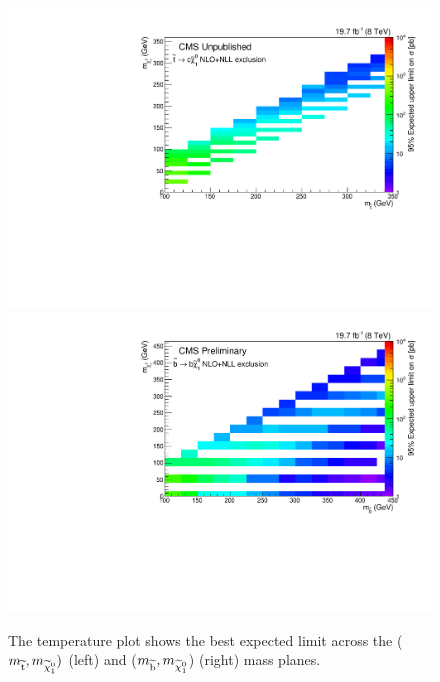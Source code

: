 \begin{figure}[!Hhtb]
  \begin{center}
  \includegraphics[scale=0.39]{Figures/sus13009/limitplots/plots/stop/optimal_stop_expected.pdf}
  \includegraphics[scale=0.39]{Figures/sus13009/limitplots/plots/sbottom/optimal_sbottom_expected.pdf}
  \caption{The temperature plot shows the best expected limit across the ($m_{\widetilde{{\rm t}}}, m_{\widetilde{\chi}^{0}_{1}})$ (left) and ($m_{\widetilde{{\rm b}}},m_{\widetilde{\chi}^{0}_{1}}$) (right) mass planes.}
  \label{fig:optimalExp}
  \end{center}
\end{figure}

